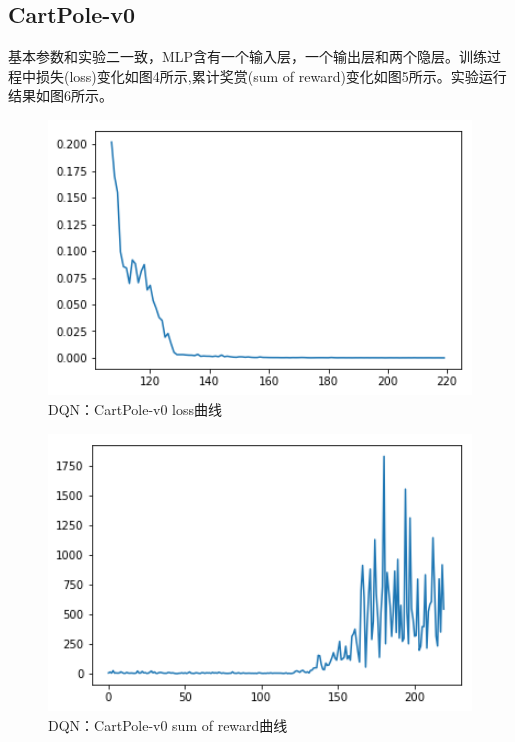 \documentclass[a4paper,UTF8]{article}
\theoremstyle{definition}
\begin{document}
    \subsection{CartPole-v0}
    基本参数和实验二一致，MLP含有一个输入层，一个输出层和两个隐层。训练过程中损失(loss)变化如图4所示,累计奖赏(sum of reward)变化如图5所示。实验运行结果如图6所示。
    \begin{center}
    \begin{figure}[H]
          \centering
          \includegraphics[width=12cm]{5.png}
          \caption{DQN：CartPole-v0 loss曲线}
          \label{fig:2.3}
    \end{figure}
    \end{center}
    \begin{center}
    \begin{figure}[H]
          \centering
          \includegraphics[width=12cm]{6.png}
          \caption{DQN：CartPole-v0 sum of reward曲线}
          \label{fig:2.3}
    \end{figure}
    \end{center}
\end{document}
